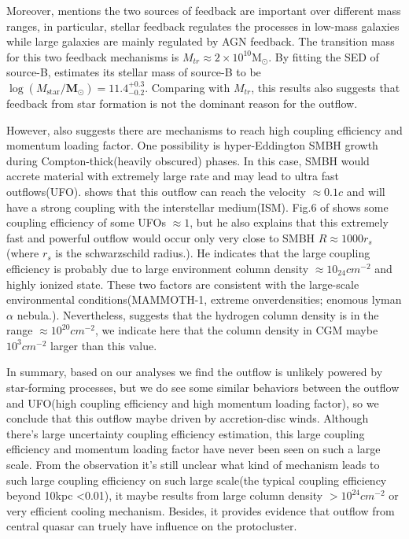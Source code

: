 	 Moreover, \cite{shankar2006new} mentions the two sources of feedback are important over different mass ranges, in particular, stellar feedback regulates the processes in low-mass galaxies while large galaxies are mainly regulated by AGN feedback. The transition mass for this two feedback mechanisms is $M_{tr} \approx 2 \times 10^{10} \mathrm{M}_{\odot} $. By fitting the SED of source-B, \cite{arrigoni2018qso} estimates its stellar mass of source-B to be $\log \left(M_{\mathrm{star}} / \mathbf{M}_{\odot}\right)=11.4_{-0.2}^{+0.3}$. Comparing with $M_{tr}$, this results also suggests that feedback from star formation is not the dominant reason for the outflow.  
	 
	 However, \cite{zubovas2018agn} also suggests there are mechanisms to reach high coupling efficiency and momentum loading factor. One possibility is hyper-Eddington SMBH growth during Compton-thick(heavily obscured) phases. In this case, SMBH would accrete material with extremely large rate and may lead to ultra fast outflows(UFO).  \cite{tombesi2013unification} shows that this outflow can reach the velocity $\approx 0.1c$ and will have a strong coupling with the interstellar medium(ISM). Fig.6 of  \cite{tombesi2013unification} shows some coupling efficiency of some UFOs $\approx 1$, but he also explains that this extremely fast and powerful outflow would occur only very close to SMBH $R \approx 1000r_{s}$(where $r_{s}$ is the schwarzschild radius.).  He indicates that the large coupling efficiency is probably due to large environment column density $\approx 10_{24} cm^{-2}$ and highly ionized state. These two factors are consistent with the large-scale environmental conditions(MAMMOTH-1, extreme onverdensities; enomous lyman$\alpha$ nebula.). Nevertheless, \cite{cai2017discovery} suggests that the hydrogen column density is in the range $\approx 10^{20} cm^{-2}$, we indicate here that the column density in CGM maybe $10^{3} cm^{-2}$ larger than this value. 
	 
	 In summary, based on our analyses we find the outflow is unlikely powered by star-forming processes, but we do see some similar behaviors between the outflow and UFO(high coupling efficiency and high momentum loading factor), so we conclude that this outflow maybe driven by accretion-disc winds. Although there's large uncertainty coupling efficiency estimation, this large coupling efficiency and momentum loading factor have never been seen on such a large scale. From the observation it's still unclear what kind of mechanism leads to such large coupling efficiency on such large scale(the typical coupling efficiency beyond 10kpc <0.01), it maybe results from large column density $>10^{24}cm^{-2}$ or very efficient cooling mechanism. Besides, it provides evidence that outflow from central quasar can truely have influence on the protocluster.

